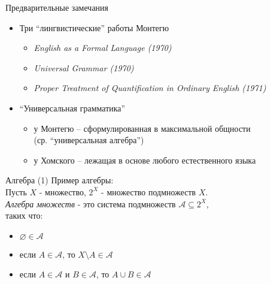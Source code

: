 \documentclass{beamer}
\begin{document}




\begin{frame}{Предварительные замечания}
\begin{itemize}
  \item Три ``лингвистические'' работы Монтегю
    \begin{itemize}
      \item \textit{English as a Formal Language (1970)}
	  \item \textit{Universal Grammar (1970)}
  	  \item \textit{Proper Treatment of Quantification in Ordinary English (1971)}
    \end{itemize}
    \bigskip
  \item ``Универсальная грамматика''
    \begin{itemize}
      \item у Монтегю -- сформулированная в максимальной общности \\(ср. ``универсальная алгебра'')
      \item у Хомского -- лежащая в основе любого естественного языка
    \end{itemize}
\end{itemize}
\end{frame}

\begin{frame}{Алгебра (1)}
Пример алгебры:\\
\bigskip
Пусть $X$ - множество, $2^X$ - множество подмножеств $X$.\\
\textit{Алгебра множеств} - это система подмножеств $\mathcal{A} \subseteq 2^X$,\\ таких что:\\
\begin{itemize}
  \item $\varnothing \in \mathcal{A}$
  \item если $A \in \mathcal{A}$, то $X \! \setminus \! A \in \mathcal{A}$
  \item если $A \in \mathcal{A}$ и $B \in \mathcal{A}$, то $A \cup B \in \mathcal{A}$
\end{itemize}
\end{frame}
\end{document}
